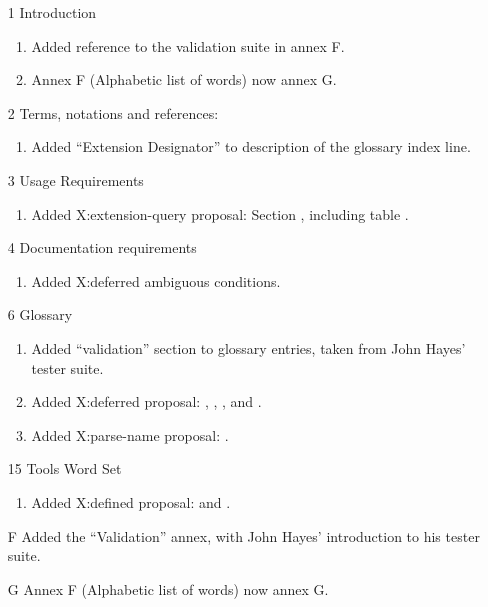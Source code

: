 	\begin{enumerate}
	\item[1] Introduction
		\begin{enumerate}
		\item Added reference to the validation suite in annex F.
		\item Annex F (Alphabetic list of words) now annex G.
		\end{enumerate}

	\item[2] Terms, notations and references:
		\begin{enumerate}
		\item Added ``Extension Designator'' to description of the
			glossary index line.
		\end{enumerate}

	\item[3] Usage Requirements
		\begin{enumerate}
		\item Added \textsf{X:extension-query} proposal:
			Section , including table
			.
		\end{enumerate}

	\item[4] Documentation requirements
		\begin{enumerate}
		\item Added \textsf{X:deferred} ambiguous conditions.
		\end{enumerate}

	\item[6] Glossary
		\begin{enumerate}
		\item Added ``validation'' section to glossary entries, taken
			from John Hayes' tester suite.
		\item Added \textsf{X:deferred} proposal:
			,
			,
			,
			 and
			.
		\item Added \textsf{X:parse-name} proposal:
			.
		\end{enumerate}

	\item[15] Tools Word Set
		\begin{enumerate}
		\item Added \textsf{X:defined} proposal:
			 and
			.
		\end{enumerate}

	\item[F] Added the ``Validation'' annex, with John Hayes'
		introduction to his tester suite.

	\item[G] Annex F (Alphabetic list of words) now annex G.
	\end{enumerate}


